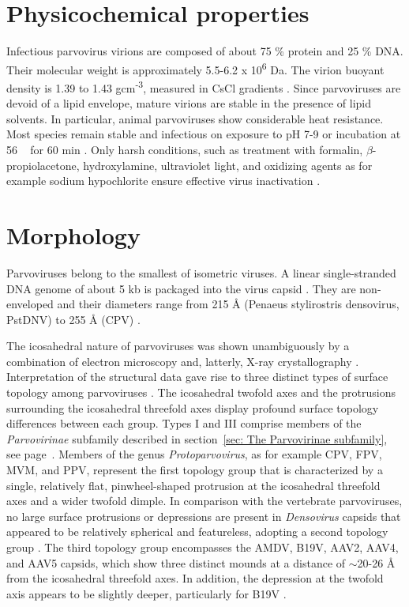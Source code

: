 \section{Physicochemical properties}
Infectious parvovirus virions are composed of about 75 \% protein and 25 \% DNA. Their molecular weight is approximately 5.5-6.2 x 10\textsuperscript{6} Da. The virion buoyant density is 1.39 to 1.43 gcm\textsuperscript{-3}, measured in CsCl gradients \cite{CsCl, pmid4317344}. Since parvoviruses are devoid of a lipid envelope, mature virions are stable in the presence of lipid solvents. In particular, animal parvoviruses show considerable heat resistance. Most species remain stable and infectious on exposure to pH 7-9 or incubation at 56 \textcelsius~ for 60 min \cite{pmid12935806, pmid12385412, pmid17880601, pmid19039515}. Only harsh conditions, such as treatment with formalin, $\beta$-propiolacetone, hydroxylamine, ultraviolet light, and oxidizing agents as for example sodium hypochlorite ensure effective virus inactivation \cite{pmid4213983, pmid3416941, pmid7848502, pmid1520981}.    


\section{Morphology}
\label{sec:Morphology}

Parvoviruses belong to the smallest of isometric viruses. A linear single-stranded DNA genome of about 5 kb is packaged into the virus capsid \cite{pmid4975639, pmid5264145, pmid5429749}. They are non-enveloped and their diameters range from 215 \r{A} (Penaeus stylirostris densovirus, PstDNV) to 255 \r{A} (CPV) \cite{pmid10497831, icvt}. 

The icosahedral nature of parvoviruses was shown unambiguously by a combination of electron microscopy and, latterly, X-ray crystallography \cite{pmid2006420}. Interpretation of the structural data gave rise to three distinct types of surface topology among parvoviruses \cite{pmid15795290}. The icosahedral twofold axes and the protrusions surrounding the icosahedral threefold axes display profound surface topology differences between each group. Types I and III comprise members of the \textit{Parvovirinae} subfamily described in section~\ref{sec: The Parvovirinae subfamily}, see page~\pageref{sec: The Parvovirinae subfamily}. Members of the genus \textit{Protoparvovirus}, as for example CPV, FPV, MVM, and PPV, represent the first topology group that is characterized by a single, relatively flat, pinwheel-shaped protrusion at the icosahedral threefold axes and a wider twofold dimple. In comparison with the vertebrate parvoviruses, no large surface protrusions or depressions are present in \textit{Densovirus} capsids that appeared to be relatively spherical and featureless, adopting a second topology group \cite{pmid15769470, pmid9817847}. The third topology group encompasses the AMDV, B19V, AAV2, AAV4, and AAV5 capsids, which show three distinct mounds at a distance of $\sim$20-26 \r{A} from the icosahedral threefold axes. In addition, the depression at the twofold axis appears to be slightly deeper, particularly for B19V \cite{pmid20375175, pmid12136130, tropism}.        



